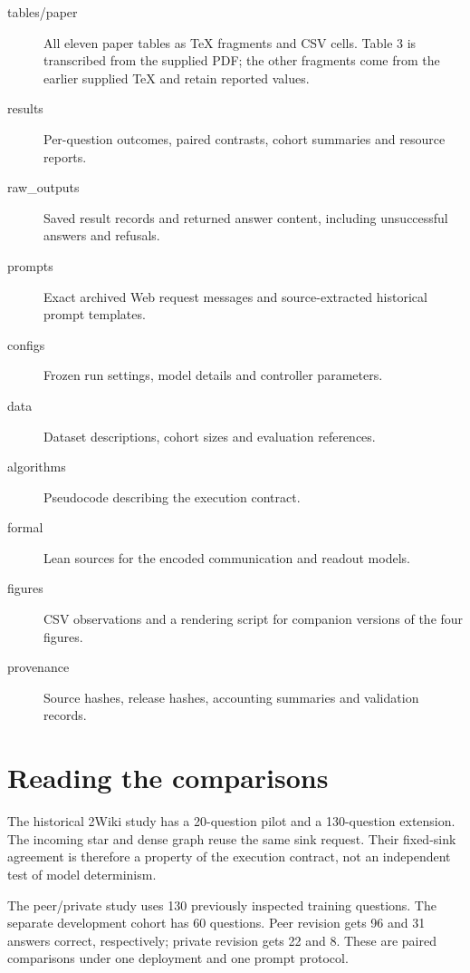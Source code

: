 \documentclass[11pt]{article}
\begin{document}
\begin{description}

\item[tables/paper] All eleven paper tables as TeX fragments and CSV cells. Table 3 is transcribed from the supplied PDF; the other fragments come from the earlier supplied TeX and retain reported values.

\item[results] Per-question outcomes, paired contrasts, cohort summaries and resource reports.

\item[raw\_outputs] Saved result records and returned answer content, including unsuccessful answers and refusals.

\item[prompts] Exact archived Web request messages and source-extracted historical prompt templates.

\item[configs] Frozen run settings, model details and controller parameters.

\item[data] Dataset descriptions, cohort sizes and evaluation references.

\item[algorithms] Pseudocode describing the execution contract.

\item[formal] Lean sources for the encoded communication and readout models.

\item[figures] CSV observations and a rendering script for companion versions of the four figures.

\item[provenance] Source hashes, release hashes, accounting summaries and validation records.

\end{description}

\section*{Reading the comparisons}

The historical 2Wiki study has a 20-question pilot and a 130-question extension. The incoming star and dense graph reuse the same sink request. Their fixed-sink agreement is therefore a property of the execution contract, not an independent test of model determinism.

The peer/private study uses 130 previously inspected training questions. The separate development cohort has 60 questions. Peer revision gets 96 and 31 answers correct, respectively; private revision gets 22 and 8. These are paired comparisons under one deployment and one prompt protocol.
\end{document}
